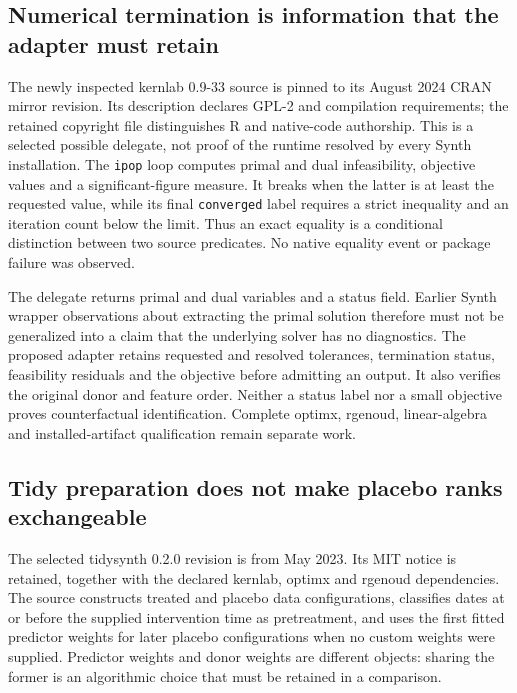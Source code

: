 \subsection{Numerical termination is information that the adapter must retain}
The newly inspected kernlab 0.9-33 source is pinned to its August 2024 CRAN
mirror revision. Its description declares GPL-2 and compilation requirements;
the retained copyright file distinguishes R and native-code authorship. This
is a selected possible delegate, not proof of the runtime resolved by every
Synth installation. The \texttt{ipop} loop computes primal and dual
infeasibility, objective values and a significant-figure measure. It breaks
when the latter is at least the requested value, while its final
\texttt{converged} label requires a strict inequality and an iteration count
below the limit. Thus an exact equality is a conditional distinction between
two source predicates. No native equality event or package failure was
observed.~\citep{exec25_synthr_kernlab}

The delegate returns primal and dual variables and a status field. Earlier
Synth wrapper observations about extracting the primal solution therefore
must not be generalized into a claim that the underlying solver has no
diagnostics. The proposed adapter retains requested and resolved tolerances,
termination status, feasibility residuals and the objective before admitting
an output. It also verifies the original donor and feature order. Neither a
status label nor a small objective proves counterfactual identification.
Complete optimx, rgenoud, linear-algebra and installed-artifact qualification
remain separate work.~\citep{exec25_synthr_kernlab,exec24_synth_source,
exec25_synthr_choice}

\subsection{Tidy preparation does not make placebo ranks exchangeable}
The selected tidysynth 0.2.0 revision is from May 2023. Its MIT notice is
retained, together with the declared kernlab, optimx and rgenoud dependencies.
The source constructs treated and placebo data configurations, classifies
dates at or before the supplied intervention time as pretreatment, and uses
the first fitted predictor weights for later placebo configurations when no
custom weights were supplied. Predictor weights and donor weights are
different objects: sharing the former is an algorithmic choice that must
be retained in a comparison.~\citep{exec25_synthr_tidysynth}

